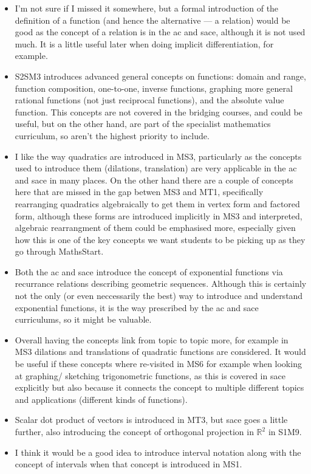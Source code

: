 \documentclass[twoside,12pt,a4paper]{report}
\begin{document}
\begin{itemize}
	\item I'm not sure if I missed it somewhere, but a formal introduction of the definition of a function (and hence the alternative --- a relation) would be good as the concept of a relation is in the \gls{ac} and \gls{sace}, although it is not used much. It is a little useful later when doing implicit differentiation, for example.
	\item S2SM3 introduces advanced general concepts on functions: domain and range, function composition, one-to-one, inverse functions, graphing more general rational functions (not just reciprocal functions), and the absolute value function. This concepts are not covered in the bridging courses, and could be useful, but on the other hand, are part of the specialist mathematics curriculum, so aren't the highest priority to include.
	\item I like the way quadratics are introduced in MS3, particularly as the concepts used to introduce them (dilations, translation) are very applicable in the \gls{ac} and \gls{sace} in many places. On the other hand there are a couple of concepts here that are missed in the gap betwen MS3 and MT1, specifically rearranging quadratics algebraically to get them in vertex form and factored form, although these forms are introduced implicitly in MS3 and interpreted, algebraic rearrangment of them could be emphasised more, especially given how this is one of the key concepts we want students to be picking up as they go through MathsStart. 
	\item Both the \gls{ac} and \gls{sace} introduce the concept of exponential functions via recurrance relations describing geometric sequences. Although this is certainly not the only (or even neccessarily the best) way to introduce and understand exponential functions, it is the way prescribed by the \gls{ac} and \gls{sace} curriculums, so it might be valuable. 
	\item Overall having the concepts link from topic to topic more, for example in MS3 dilations and translations of quadratic functions are considered. It would be useful if these concepts where re-visited in MS6 for example when looking at graphing/ sketching trigonometric functions, as this is covered in \gls{sace} explicitly but also because it connects the concept to multiple different topics and applications (different kinds of functions).
	\item Scalar dot product of vectors is introduced in MT3, but \gls{sace} goes a little further, also introducing the concept of orthogonal projection in $\mathbb{R}^2$ in S1M9.
	\item I think it would be a good idea to introduce interval notation along with the concept of intervals when that concept is introduced in MS1.
\end{itemize}
\end{document}
